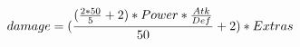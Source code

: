 \documentclass[preview]{standalone}
\begin{document}
\begin{align*}
\special{dvisvgm:raw <g id='unique000'>}damage = (\frac{(\frac{2 * 50}{5} + 2) * Power * \frac{Atk}{Def}}{50} + 2) * Extras\special{dvisvgm:raw </g>}
\end{align*}
\end{document}
